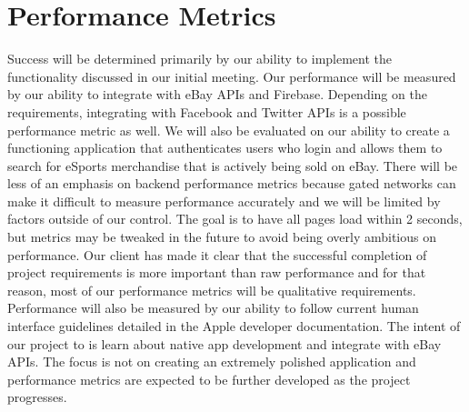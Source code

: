 \documentclass[onecolumn, draftclsnofoot,10pt, compsoc]{IEEEtran}
\begin{document}
\section{Performance Metrics}
Success will be determined primarily by our ability to implement the functionality discussed in our initial meeting. 
Our performance will be measured by our ability to integrate with eBay APIs and Firebase. 
Depending on the requirements, integrating with Facebook and Twitter APIs is a possible performance metric as well. 
We will also be evaluated on our ability to create a functioning application that authenticates users who login and allows them to search for eSports merchandise that is actively being sold on eBay. 
There will be less of an emphasis on backend performance metrics because gated networks can make it difficult to measure performance accurately and we will be limited by factors outside of our control. 
The goal is to have all pages load within 2 seconds, but metrics may be tweaked in the future to avoid being overly ambitious on performance. 
Our client has made it clear that the successful completion of project requirements is more important than raw performance and for that reason, most of our performance metrics will be qualitative requirements. 
Performance will also be measured by our ability to follow current human interface guidelines detailed in the Apple developer documentation. 
The intent of our project to is learn about native app development and integrate with eBay APIs. 
The focus is not on creating an extremely polished application and performance metrics are expected to be further developed as the project progresses. 
\end{document}
